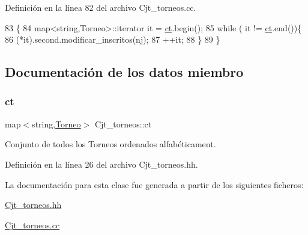 Definición en la línea 82 del archivo Cjt\+\_\+torneos.\+cc.


\begin{DoxyCode}
83 \{
84     map<string,Torneo>::iterator it = \hyperlink{class_cjt__torneos_a701df4fc4fbd2d6ffa081a01845083f3}{ct}.begin();
85     \textcolor{keywordflow}{while} ( it != \hyperlink{class_cjt__torneos_a701df4fc4fbd2d6ffa081a01845083f3}{ct}.end())\{
86         (*it).second.modificar\_inscritos(nj);
87         ++it;
88     \}
89 \}
\end{DoxyCode}


\subsection{Documentación de los datos miembro}
\mbox{\label{class_cjt__torneos_a701df4fc4fbd2d6ffa081a01845083f3}} 
\subsubsection{\texorpdfstring{ct}{ct}}
{\footnotesize\ttfamily map$<$string,\hyperlink{class_torneo}{Torneo}$>$ Cjt\+\_\+torneos\+::ct\hspace{0.3cm}{\ttfamily [private]}}



Conjunto de todos los Torneos ordenados alfabéticament. 



Definición en la línea 26 del archivo Cjt\+\_\+torneos.\+hh.



La documentación para esta clase fue generada a partir de los siguientes ficheros\+:\begin{DoxyCompactItemize}
\item 
\hyperlink{_cjt__torneos_8hh}{Cjt\+\_\+torneos.\+hh}\item 
\hyperlink{_cjt__torneos_8cc}{Cjt\+\_\+torneos.\+cc}\end{DoxyCompactItemize}
